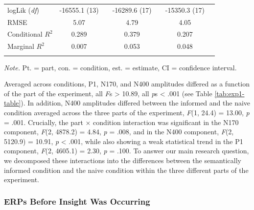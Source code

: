 \documentclass[
  english,
  man,floatsintext]{apa7}
\begin{document}
\begin{table}[tbp]
\begin{center}
\begin{threeparttable}
{\begin{tabular}{lcccccc}
logLik (\textit{df}) & -16555.1 (13) &  & -16289.6 (17) &  & -15350.3 (17) & \\
RMSE & 5.07 &  & 4.79 &  & 4.05 & \\
Conditional $R^2$ & 0.289 &  & 0.379 &  & 0.207 & \\
Marginal $R^2$ & 0.007 &  & 0.053 &  & 0.048 & \\
\bottomrule
\addlinespace
\end{tabular}

}

\begin{tablenotes}[para]
\normalsize{\textit{Note.} Pt. = part, con. = condition, est. = estimate, CI = confidence interval.}
\end{tablenotes}

\end{threeparttable}
\end{center}

\end{table}

Averaged across conditions, P1, N170, and N400 amplitudes differed as a function of the part of the experiment, all \emph{F}s \textgreater{} 10.89, all \emph{p}s \textless{} .001 (see Table \ref{tab:exp1-table}). In addition, N400 amplitudes differed between the informed and the naive condition averaged across the three parts of the experiment, \emph{F}(1, 24.4) = 13.00, \emph{p} = .001. Crucially, the part × condition interaction was significant in the N170 component, \emph{F}(2, 4878.2) = 4.84, \emph{p} = .008, and in the N400 component, \emph{F}(2, 5120.9) = 10.91, \emph{p} \textless{} .001, while also showing a weak statistical trend in the P1 component, \emph{F}(2, 4605.1) = 2.30, \emph{p} = .100. To answer our main research question, we decomposed these interactions into the differences between the semantically informed condition and the naive condition within the three different parts of the experiment.

\hypertarget{erps-before-insight-was-occurring}{%
\subsubsection{ERPs Before Insight Was Occurring}\label{erps-before-insight-was-occurring}}
\end{document}
